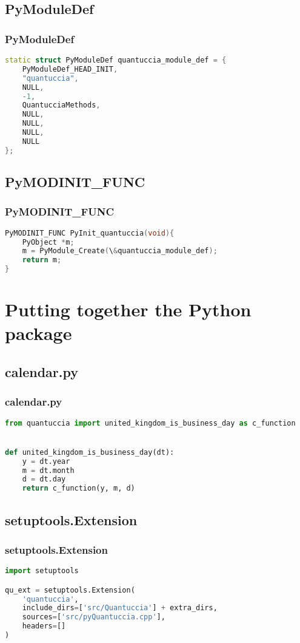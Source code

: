 \documentclass{beamer}
\begin{document}
	\subsection{PyModuleDef}
	\begin{frame}[fragile]
		\frametitle{PyModuleDef}
		\begin{lstlisting}[language=C++]
static struct PyModuleDef quantuccia_module_def = {
    PyModuleDef_HEAD_INIT,
    "quantuccia",
    NULL,
    -1,
    QuantucciaMethods,
    NULL,
    NULL,
    NULL,
    NULL
};
		\end{lstlisting}
	\end{frame}

	\subsection{PyMODINIT\_FUNC}
	\begin{frame}[fragile]
		\frametitle{PyMODINIT\_FUNC}
		\begin{lstlisting}[language=C++]
PyMODINIT_FUNC PyInit_quantuccia(void){
    PyObject *m;
    m = PyModule_Create(\&quantuccia_module_def);
    return m;
}
		\end{lstlisting}
	\end{frame}

	\section{Putting together the Python package}

	\subsection{calendar.py}
	\begin{frame}[fragile]
		\frametitle{calendar.py}
		\begin{lstlisting}[language=Python]
from quantuccia import united_kingdom_is_business_day as c_function


def united_kingdom_is_business_day(dt):
    y = dt.year
    m = dt.month
    d = dt.day
    return c_function(y, m, d)
		\end{lstlisting}
	\end{frame}

	\subsection{setuptools.Extension}
	\begin{frame}[fragile]
		\frametitle{setuptools.Extension}
		\begin{lstlisting}[language=Python]
import setuptools

qu_ext = setuptools.Extension(
    'quantuccia',
    include_dirs=['src/Quantuccia'] + extra_dirs,   
    sources=['src/pyQuantuccia.cpp'],
    headers=[]
)
		\end{lstlisting}
	\end{frame}
\end{document}
